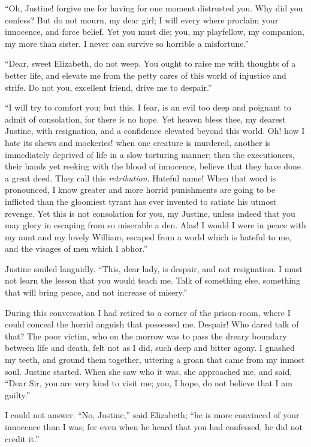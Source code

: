 ``Oh, Justine! forgive me for having
for one moment distrusted you. Why
did you confess? But do not mourn,
my dear girl; I will every where proclaim
your innocence, and force belief.
Yet you must die; you, my playfellow,
my companion, my more than sister.
I never can survive so horrible a misfortune.''

``Dear, sweet Elizabeth, do not
weep. You ought to raise me with
thoughts of a better life, and elevate
me from the petty cares of this world
of injustice and strife. Do not you,
excellent friend, drive me to despair.''

``I will try to comfort you; but this,
I fear, is an evil too deep and poignant
to admit of consolation, for there is no
hope. Yet heaven bless thee, my dearest
Justine, with resignation, and a confidence
elevated beyond this world.
Oh! how I hate its shews and mockeries!
when one creature is murdered,
another is immediately deprived of life
in a slow torturing manner; then the
executioners, their hands yet reeking
with the blood of innocence, believe
that they have done a great deed. They
call this \emph{retribution}. Hateful name!
When that word is pronounced, I know
greater and more horrid punishments
are going to be inflicted than the gloomiest
tyrant has ever invented to satiate
his utmost revenge. Yet this is not
consolation for you, my Justine, unless
indeed that you may glory in escaping
from so miserable a den. Alas! I
would I were in peace with my aunt
and my lovely William, escaped from a
world which is hateful to me, and the
visages of men which I abhor.''

Justine smiled languidly. ``This,
dear lady, is despair, and not resignation.
I must not learn the lesson that
you would teach me. Talk of something
else, something that will bring
peace, and not increase of misery.''

During this conversation I had retired
to a corner of the prison-room, where
I could conceal the horrid anguish that
possessed me. Despair! Who dared
talk of that? The poor victim, who
on the morrow was to pass the dreary
boundary between life and death, felt
not as I did, such deep and bitter
agony. I gnashed my teeth, and
ground them together, uttering a groan
that came from my inmost soul.
Justine started. When she saw who it
was, she approached me, and said,
``Dear Sir, you are very kind to visit
me; you, I hope, do not believe that I
am guilty.''

I could not answer. ``No, Justine,''
said Elizabeth; ``he is more convinced
of your innocence than I was; for
even when he heard that you had confessed,
he did not credit it.''


